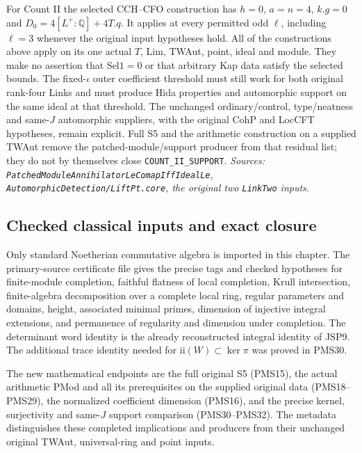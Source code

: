 For Count II the selected CCH--CFO construction has
$h=0$, $a=n=4$, $k.g=0$ and
$D_0=4[L^+:\mathbb Q]+4T.q$.
It applies at every permitted odd $\ell$, including $\ell=3$
whenever the original input hypotheses hold.
All of the constructions above apply on its one actual
$T$, Lim, TWAut, point, ideal and module.
They make no assertion that $\mathrm{Sel1}=0$ or that
arbitrary Kap data satisfy the selected bounds.
The fixed-$\iota$ outer coefficient threshold must still
work for both original rank-four Links and must produce
Hida properties and automorphic support on the same ideal
at that threshold.  The unchanged ordinary/control,
type/neatness and same-$J$ automorphic suppliers, with
the original CohP and LocCFT hypotheses, remain explicit.
Full S5 and the arithmetic construction on a supplied
TWAut remove the patched-module/support producer from
that residual list; they do not by themselves close
\texttt{COUNT\_II\_SUPPORT}.
\hfill\textit{Sources:
\texttt{PatchedModuleAnnihilatorLe}\allowbreak\texttt{ComapIffIdealLe},
\texttt{AutomorphicDetection/LiftPt.core},
the original two \texttt{LinkTwo} inputs.}

\subsection{Checked classical inputs and exact closure}

Only standard Noetherian commutative algebra is imported in
this chapter.  The primary-source certificate file gives the
precise tags and checked hypotheses for finite-module
completion, faithful flatness of local completion, Krull
intersection, finite-algebra decomposition over a complete
local ring, regular parameters and domains, height, associated
minimal primes, dimension of injective integral extensions,
and permanence of regularity and dimension under completion.
The determinant word identity is the already reconstructed
integral identity of JSP9.  The additional trace identity
needed for $\mathrm{ii}(W)\subset\ker\pi$ was proved in PMS30.

The new mathematical endpoints are the full original S5
(PMS15), the actual arithmetic PMod and all its prerequisites
on the supplied original data (PMS18--PMS29), the normalized
coefficient dimension (PMS16), and the precise kernel,
surjectivity and same-$J$ support comparison
(PMS30--PMS32).  The metadata distinguishes these completed
implications and producers from their unchanged original
TWAut, universal-ring and point inputs.
